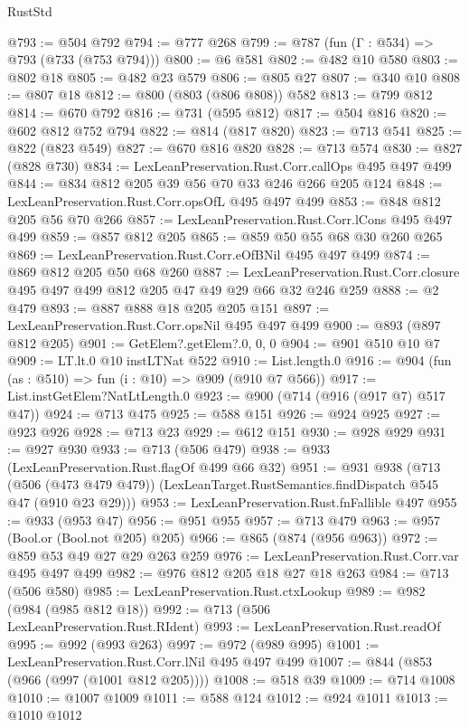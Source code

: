 \begin{lexlean}{RustStd}
\begin{coremodule}
@793 := @504 @792
@794 := @777 @268
@799 := @787 (fun (Γ : @534) => @793 (@733 (@753 @794)))
@800 := @6 @581
@802 := @482 @10 @580
@803 := @802 @18
@805 := @482 @23 @579
@806 := @805 @27
@807 := @340 @10
@808 := @807 @18
@812 := @800 (@803 (@806 @808)) @582
@813 := @799 @812
@814 := @670 @792
@816 := @731 (@595 @812)
@817 := @504 @816
@820 := @602 @812 @752 @794
@822 := @814 (@817 @820)
@823 := @713 @541
@825 := @822 (@823 @549)
@827 := @670 @816 @820
@828 := @713 @574
@830 := @827 (@828 @730)
@834 := LexLeanPreservation.Rust.Corr.callOps @495 @497 @499
@844 := @834 @812 @205 @39 @56 @70 @33 @246 @266 @205 @124
@848 := LexLeanPreservation.Rust.Corr.opsOfL @495 @497 @499
@853 := @848 @812 @205 @56 @70 @266
@857 := LexLeanPreservation.Rust.Corr.lCons @495 @497 @499
@859 := @857 @812 @205
@865 := @859 @50 @55 @68 @30 @260 @265
@869 := LexLeanPreservation.Rust.Corr.eOfBNil @495 @497 @499
@874 := @869 @812 @205 @50 @68 @260
@887 := LexLeanPreservation.Rust.Corr.closure @495 @497 @499 @812 @205 @47 @49 @29 @66 @32 @246 @259
@888 := @2 @479
@893 := @887 @888 @18 @205 @205 @151
@897 := LexLeanPreservation.Rust.Corr.opsNil @495 @497 @499
@900 := @893 (@897 @812 @205)
@901 := GetElem?.getElem?.{0, 0, 0}
@904 := @901 @510 @10 @7
@909 := LT.lt.{0} @10 instLTNat @522
@910 := List.length.{0}
@916 := @904 (fun (as : @510) => fun (i : @10) => @909 (@910 @7 @566))
@917 := List.instGetElem?NatLtLength.{0}
@923 := @900 (@714 (@916 (@917 @7) @517 @47))
@924 := @713 @475
@925 := @588 @151
@926 := @924 @925
@927 := @923 @926
@928 := @713 @23
@929 := @612 @151
@930 := @928 @929
@931 := @927 @930
@933 := @713 (@506 @479)
@938 := @933 (LexLeanPreservation.Rust.flagOf @499 @66 @32)
@951 := @931
    @938
    (@713
      (@506 (@473 @479 @479))
      (LexLeanTarget.RustSemantics.findDispatch @545 @47 (@910 @23 @29)))
@953 := LexLeanPreservation.Rust.fnFallible @497
@955 := @933 (@953 @47)
@956 := @951 @955
@957 := @713 @479
@963 := @957 (Bool.or (Bool.not @205) @205)
@966 := @865 (@874 (@956 @963))
@972 := @859 @53 @49 @27 @29 @263 @259
@976 := LexLeanPreservation.Rust.Corr.var @495 @497 @499
@982 := @976 @812 @205 @18 @27 @18 @263
@984 := @713 (@506 @580)
@985 := LexLeanPreservation.Rust.ctxLookup
@989 := @982 (@984 (@985 @812 @18))
@992 := @713 (@506 LexLeanPreservation.Rust.RIdent)
@993 := LexLeanPreservation.Rust.readOf
@995 := @992 (@993 @263)
@997 := @972 (@989 @995)
@1001 := LexLeanPreservation.Rust.Corr.lNil @495 @497 @499
@1007 := @844 (@853 (@966 (@997 (@1001 @812 @205))))
@1008 := @518 @39
@1009 := @714 @1008
@1010 := @1007 @1009
@1011 := @588 @124
@1012 := @924 @1011
@1013 := @1010 @1012

\end{coremodule}
\end{lexlean}
